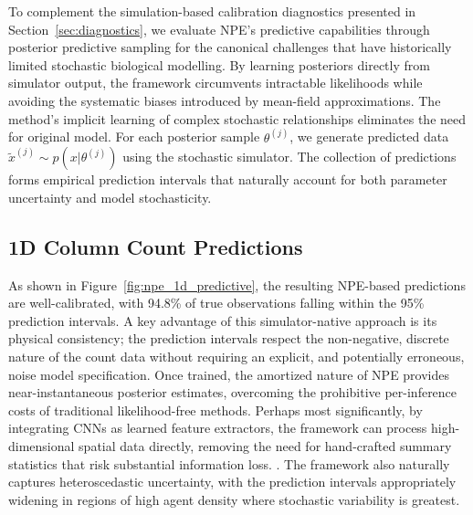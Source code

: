 \documentclass{article}
\providecommand{\DIFaddtex}[1]{{\protect\color{blue} \sf #1}} %
\providecommand{\DIFdeltex}[1]{{\protect\color{red} \scriptsize #1}} %
\providecommand{\DIFaddbegin}{} %
\providecommand{\DIFaddend}{} %
\providecommand{\DIFdelbegin}{} %
\providecommand{\DIFdelend}{} %
\providecommand{\DIFadd}[1]{\texorpdfstring{\DIFaddtex{#1}}{#1}} %
\providecommand{\DIFdel}[1]{\texorpdfstring{\DIFdeltex{#1}}{}} %
\newcommand{\DIFscaledelfig}{0.5}
\newlength{\DIFdelgraphicswidth} %
\newlength{\DIFdelgraphicsheight} %
\newcommand{\DIFaddincludegraphics}[2][]{{\color{blue}\fbox{\DIFOincludegraphics[#1]{#2}}}} %
\newcommand{\DIFdelincludegraphics}[2][]{%
\sbox{\DIFdelgraphicsbox}{\DIFOincludegraphics[#1]{#2}}%
\settoboxwidth{\DIFdelgraphicswidth}{\DIFdelgraphicsbox} %
\settoboxtotalheight{\DIFdelgraphicsheight}{\DIFdelgraphicsbox} %
\scalebox{\DIFscaledelfig}{%
\parbox[b]{\DIFdelgraphicswidth}{\usebox{\DIFdelgraphicsbox}\\[-\baselineskip] \rule{\DIFdelgraphicswidth}{0em}}\llap{\resizebox{\DIFdelgraphicswidth}{\DIFdelgraphicsheight}{%
\setlength{\unitlength}{\DIFdelgraphicswidth}%
\begin{picture}(1,1)%
\thicklines\linethickness{2pt} %
{\color[rgb]{1,0,0}\put(0,0){\framebox(1,1){}}}%
{\color[rgb]{1,0,0}\put(0,0){\line( 1,1){1}}}%
{\color[rgb]{1,0,0}\put(0,1){\line(1,-1){1}}}%
\end{picture}%
}\hspace*{3pt}}} %
} %
\DeclareRobustCommand{\DIFaddbegin}{\DIFOaddbegin \let\includegraphics\DIFaddincludegraphics} %
\DeclareRobustCommand{\DIFaddend}{\DIFOaddend \let\includegraphics\DIFOincludegraphics} %
\DeclareRobustCommand{\DIFdelbegin}{\DIFOdelbegin \let\includegraphics\DIFdelincludegraphics} %
\DeclareRobustCommand{\DIFdelend}{\DIFOaddend \let\includegraphics\DIFOincludegraphics} %
\begin{document}
\DIFadd{To complement the simulation-based calibration diagnostics presented in Section~\ref{sec:diagnostics}, we evaluate NPE's predictive capabilities through posterior predictive sampling for }\DIFaddend the \DIFdelbegin \DIFdel{canonical challenges that have historically limited stochastic biological modelling. By learning posteriors directly from simulator output, the framework circumvents intractable likelihoods while avoiding the systematic biases introduced by mean-field approximations. The method's implicit learning of complex stochastic relationships eliminates the need for }\DIFdelend \DIFaddbegin \DIFadd{original model. For each posterior sample $\theta^{(j)}$, we generate predicted data $\tilde{x}^{(j)} \sim p(x|\theta^{(j)})$ using the stochastic simulator. The collection of predictions forms empirical prediction intervals that naturally account for both parameter uncertainty and model stochasticity.
}

\subsection{\DIFadd{1D Column Count Predictions}}

\DIFadd{As shown in Figure~\ref{fig:npe_1d_predictive}, the resulting NPE-based predictions are well-calibrated, with 94.8\% of true observations falling within the 95\% prediction intervals. A key advantage of this simulator-native approach is its physical consistency; the prediction intervals respect the non-negative, discrete nature of the count data without requiring an }\DIFaddend explicit, and potentially erroneous, noise model\DIFdelbegin \DIFdel{specification. Once trained, the amortized nature of NPE provides near-instantaneous posterior estimates, overcoming the prohibitive per-inference costs of traditional likelihood-free methods. Perhaps most significantly, by integrating CNNs as learned feature extractors, the framework can process high-dimensional spatial data directly, removing the need for hand-crafted summary statistics that risk substantial information loss.
}\DIFdelend \DIFaddbegin \DIFadd{. The framework also naturally captures heteroscedastic uncertainty, with the prediction intervals appropriately widening in regions of high agent density where stochastic variability is greatest.
}\DIFaddend 
\end{document}
